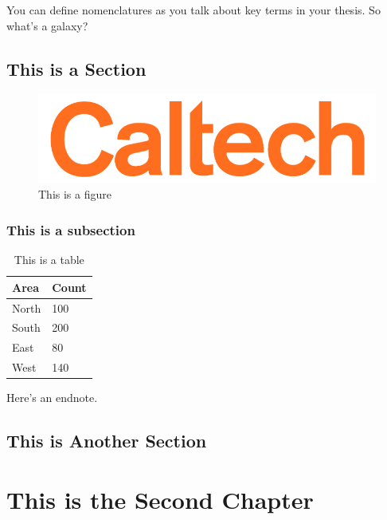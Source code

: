 \documentclass[12pt]{caltech_thesis}
\begin{document}
You can define nomenclatures  as you talk about key terms in your thesis. So what's a galaxy? 


\section{This is a Section}
\lipsum[1-2]

\begin{figure}[hbt!]
\centering
\includegraphics[width=.3\textwidth]{caltech.png}
\caption{This is a figure}\label{fig:logo}
\end{figure}

\subsection{This is a subsection}

\begin{table}[hbt!]
\centering
\begin{tabular}{ll}
\hline
Area & Count\\
\hline
North & 100\\
South & 200\\
East & 80\\
West & 140\\
\hline
\end{tabular}
\caption{This is a table}\label{tab:sample}
\end{table}

\lipsum[3] 

\lipsum[4-5]

Here's an endnote.

\section{This is Another Section}
\lipsum[6-7]

\chapter{This is the Second Chapter}
\end{document}
